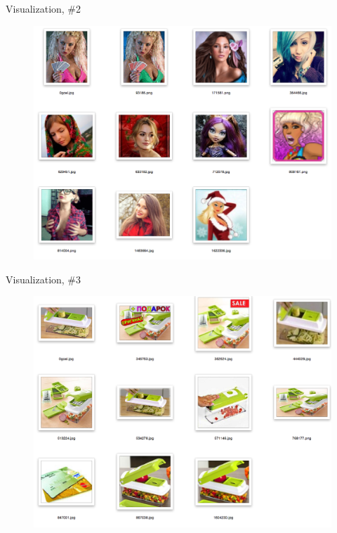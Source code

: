 \documentclass{beamer}
\begin{document}
\begin{frame}{Visualization, \#2}

\begin{figure}[h!]
  \centering
  \includegraphics[width=1\textwidth]{images/search2.png}
\end{figure}

\end{frame}


\begin{frame}{Visualization, \#3}

\begin{figure}[h!]
  \centering
  \includegraphics[width=1\textwidth]{images/search3.png}
\end{figure}

\end{frame}
\end{document}

